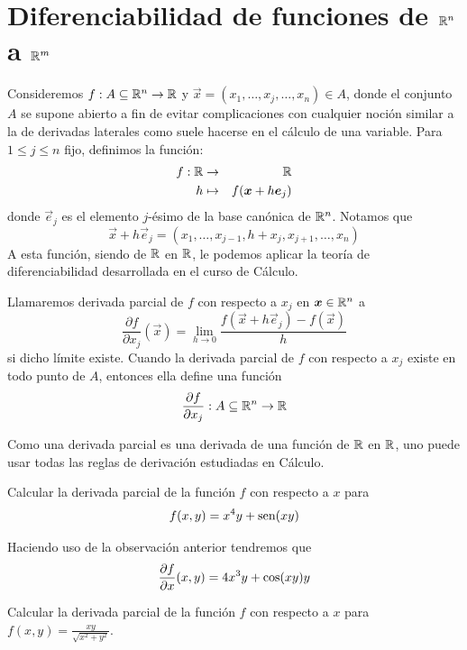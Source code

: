 \section{Diferenciabilidad de funciones de \texorpdfstring{$\mathbb{R}^n$}{Rn} a \texorpdfstring{$\mathbb{R}^m$}{Rm}}\label{1.4}

Consideremos $f:A\subseteq\mathbb{R}^n\to\mathbb{R}$ y $\vec{x}=(x_1,\ldots,x_j,\ldots,x_n)\in A$,
donde el conjunto $A$ se supone abierto a fin de evitar complicaciones con cualquier noci\'on similar a la de derivadas laterales como suele hacerse en el c\'alculo de una variable. Para $1\le j\le n$ fijo, definimos 
la funci\'on:
\begin{eqnarray*}
f: \mathbb{R} & \rightarrow & \mathbb{R} \\
h 	  & \mapsto     & f( \boldsymbol{x}+h\boldsymbol{e}_j )
\end{eqnarray*}
donde $\vec{e}_j$ es el elemento $j$-\'esimo de la 
base can\'onica de $\mathbb{R}^n$. Notamos que 
$$\vec{x}+h\vec{e}_j=(x_1,\ldots,x_{j-1},h+x_j,x_{j+1},\ldots,x_n)$$ 
A esta funci\'on, siendo de $\mathbb{R}$ en $\mathbb{R}$, le podemos aplicar la
teor\'ia de diferenciabilidad desarrollada en el curso de C\'alculo. 
\begin{definicion} Llamaremos derivada parcial  de $f$ con respecto a 
$x_j$ en $\boldsymbol{x}\in\mathbb{R}^n$ a
$$\frac{\partial f}{\partial x_j}(\vec{x})=\lim_{h\to 0}\frac{f( \vec{x}+h\vec{e}_j)
-f(\vec{x})}{h}$$
si dicho l\'imite existe.
Cuando la derivada parcial de $f$ con respecto a $x_j$ existe en todo punto de 
$A$, entonces ella define una funci\'on 
$$\frac{\partial f}{\partial x_j}:
A\subseteq\mathbb{R}^n\to\mathbb{R}$$
\end{definicion}

\begin{nota} 
Como una derivada parcial es una derivada de una funci\'on de $\mathbb{R}$ en $\mathbb{R}$, uno puede usar todas las reglas de derivaci\'on estudiadas en C\'alculo.
\end{nota}

\begin{ejemplo} 
Calcular la derivada parcial de la funci\'on $f$ con respecto a $x$ para 
$$f(x,y)=x^4 y+\text{sen}(xy)$$

\begin{solucion}
Haciendo uso de la observaci\'on anterior tendremos que
$$\frac{\partial f}{\partial x}(x,y)=4x^3 y+\cos(xy)y$$
\end{solucion}
\end{ejemplo}

\begin{ejemplo}  
Calcular la derivada parcial de la funci\'on $f$ con respecto a $x$ para
$f(x,y)=\frac{xy}{\sqrt{x^2+y^2}}$.
\end{ejemplo}

